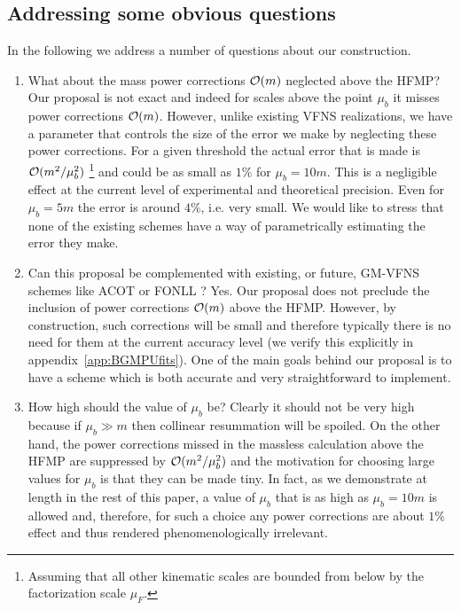 \documentclass[letter,11pt]{article}
\newcommand{\muF}{\mu_F}
\def\mub{\mu_b}
\begin{document}
\subsection{Addressing some obvious questions}



In the following we address a number of questions about our construction.

%
\begin{enumerate}
%
\item What about the mass power corrections ${\cal O}(m)$ neglected above the HFMP? Our proposal is not exact and indeed for scales above the point $\mub$ it misses power corrections ${\cal O}(m)$. However, unlike existing VFNS realizations, we have a parameter that controls the size of the error we make by neglecting these power corrections. For a given threshold the actual error that is made is ${\cal O}(m^2/\mub^2)$ 
%
\footnote{Assuming that all other kinematic scales are bounded from below by the factorization scale $\muF$.}
%
and could be as small as $1\%$ for $\mub=10 m$. This is a negligible effect at the current level of experimental and theoretical precision. Even for $\mub=5 m$ the error is around $4\%$, i.e. very small. We would like to stress that none of the existing schemes have a way of parametrically estimating the error they make.
%
\item Can this proposal be complemented with existing, or future, GM-VFNS schemes like ACOT \cite{Aivazis:1993pi} or FONLL \cite{Forte:2010ta}? Yes. Our proposal does not preclude the inclusion of power corrections ${\cal O}(m)$ above the HFMP. However, by construction, such corrections will be small and therefore typically there is no need for them at the current accuracy level (we verify this explicitly in appendix~\ref{app:BGMPUfits}). One of the main goals behind our proposal is to have a scheme which is both accurate and very straightforward to implement.
%
\item How high should the value of $\mub$ be? Clearly it should not be very high because if $\mub\gg m$ then collinear resummation will be spoiled. On the other hand, the power corrections missed 
in the massless calculation above the HFMP are suppressed by ${\cal O}(m^2/\mub^2)$ and the motivation for choosing large values for $\mub$ is that they can be made tiny. In fact, as we demonstrate at length in the rest of this paper, a value of $\mub$ that is as high as $\mub=10 m$ is allowed and, therefore, for such a choice any power corrections are about $1\%$ effect and thus rendered phenomenologically irrelevant. 

\end{enumerate}
\end{document}

